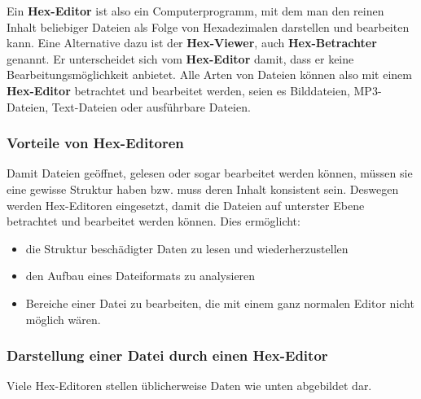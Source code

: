 \documentclass[10pt,a4paper]{article} %
\begin{document}
Ein \textbf{Hex-Editor} ist also ein Computerprogramm, mit dem man den reinen Inhalt beliebiger Dateien als Folge von Hexadezimalen darstellen und bearbeiten kann. Eine Alternative dazu ist der \textbf{Hex-Viewer}, auch \textbf{Hex-Betrachter} genannt. Er unterscheidet sich vom \textbf{Hex-Editor} damit, dass er keine Bearbeitungsmöglichkeit anbietet.  \newline
Alle Arten von Dateien können also mit einem \textbf{Hex-Editor} betrachtet und bearbeitet werden, seien es Bilddateien, MP3-Dateien, Text-Dateien oder ausführbare Dateien. \cite{explain_hex}
\subsubsection{Vorteile von Hex-Editoren}
Damit Dateien geöffnet, gelesen oder sogar bearbeitet werden können, müssen sie eine gewisse Struktur haben bzw. muss deren Inhalt konsistent sein. Deswegen werden Hex-Editoren eingesetzt, damit die Dateien auf unterster Ebene betrachtet und bearbeitet werden können. Dies ermöglicht:
\begin{itemize}
\item
die Struktur beschädigter Daten zu lesen und wiederherzustellen
\item
den Aufbau eines Dateiformats zu analysieren
\item
Bereiche einer Datei zu bearbeiten, die mit einem ganz normalen Editor nicht möglich wären.
\end{itemize}
\pagebreak
\subsubsection{Darstellung einer Datei durch einen Hex-Editor}
Viele Hex-Editoren stellen üblicherweise Daten wie unten abgebildet dar.\newline
\end{document}
